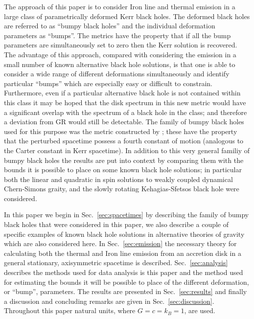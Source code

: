 The approach of this paper is to consider Iron line and thermal emission in a large class of parametrically deformed Kerr black holes. The deformed black holes are referred to as ``bumpy black holes'' and the individual deformation parameters as ``bumps''. The metrics have the property that if all the bump parameters are simultaneously set to zero then the Kerr solution is recovered. The advantage of this approach, compared with considering the emission in a small number of known alternative black hole solutions, is that one is able to consider a wide range of different deformations simultaneously and identify particular ``bumps'' which are especially easy or difficult to constrain. Furthermore, even if a particular alternative black hole is not contained within this class it may be hoped that the disk spectrum in this new metric would have a significant overlap with the spectrum of a black hole in the class; and therefore a deviation from GR would still be detectable. The family of bumpy black holes used for this purpose was the metric constructed by \cite{2011PhRvD..83j4027V}; these have the property that the perturbed spacetime possess a fourth constant of motion (analogous to the Carter constant \citep{PhysRev.174.1559} in Kerr spacetime). In addition to this very general familiy of bumpy black holes the results are put into context by comparing them with the bounds it is possible to place on some known black hole solutions; in particular both the linear \cite{2009PhRvD..79h4043Y} and quadratic \citep{2012PhRvD..86d4037Y} in spin solutions to weakly coupled dynamical Chern-Simons graity, and the slowly rotating Kehagias-Sfetsos black hole \citep{2010EPJC...70..367L} were considered.

In this paper we begin in Sec.\ \ref{sec:spacetimes} by describing the family of bumpy black holes that were considered in this paper, we also describe a couple of specific examples of known black hole solutions in alternative theories of gravity which are also considered here. In Sec.\ \ref{sec:emission} the necessary theory for calculating both the thermal and Iron line emission from an accretion disk in a general stationary, axisymmetric spacetime is described. Sec.\ \ref{sec:analysis} describes the methods used for data analysis is this paper and the method used for estimating the bounds it will be possible to place of the different deformation, or ``bump'', parameters. The results are presented in Sec.\ \ref{sec:results} and finally a discussion and concluding remarks are given in Sec.\ \ref{sec:discussion}. Throughout this paper natural units, where $G=c=k_{B}=1$, are used.


